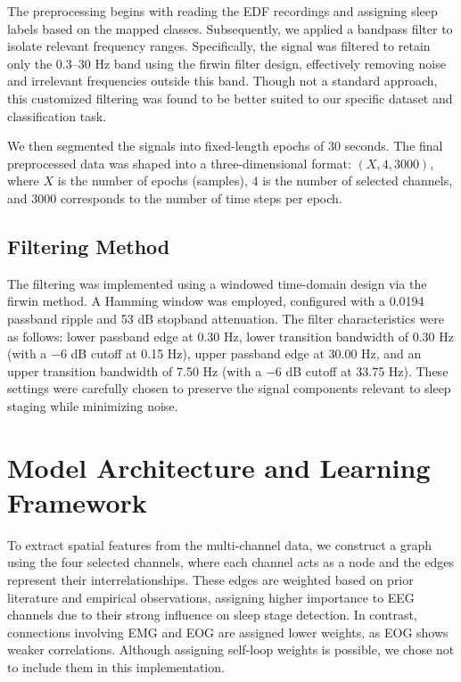 The preprocessing begins with reading the EDF recordings and assigning sleep labels based on the mapped classes. Subsequently, we applied a bandpass filter to isolate relevant frequency ranges. Specifically, the signal was filtered to retain only the 0.3–30 Hz band using the firwin filter design, effectively removing noise and irrelevant frequencies outside this band. Though not a standard approach, this customized filtering was found to be better suited to our specific dataset and classification task.

We then segmented the signals into fixed-length epochs of 30 seconds. The final preprocessed data was shaped into a three-dimensional format: $(X, 4, 3000)$, where $X$ is the number of epochs (samples), $4$ is the number of selected channels, and $3000$ corresponds to the number of time steps per epoch.

\subsection{Filtering Method}

The filtering was implemented using a windowed time-domain design via the firwin method. A Hamming window was employed, configured with a 0.0194 passband ripple and 53 dB stopband attenuation. The filter characteristics were as follows: lower passband edge at 0.30 Hz, lower transition bandwidth of 0.30 Hz (with a $-6$ dB cutoff at 0.15 Hz), upper passband edge at 30.00 Hz, and an upper transition bandwidth of 7.50 Hz (with a $-6$ dB cutoff at 33.75 Hz). These settings were carefully chosen to preserve the signal components relevant to sleep staging while minimizing noise.























\section{Model Architecture and Learning Framework}

To extract spatial features from the multi-channel data, we construct a graph using the four selected channels, where each channel acts as a node and the edges represent their interrelationships. These edges are weighted based on prior literature and empirical observations, assigning higher importance to EEG channels due to their strong influence on sleep stage detection. In contrast, connections involving EMG and EOG are assigned lower weights, as EOG shows weaker correlations. Although assigning self-loop weights is possible, we chose not to include them in this implementation.


